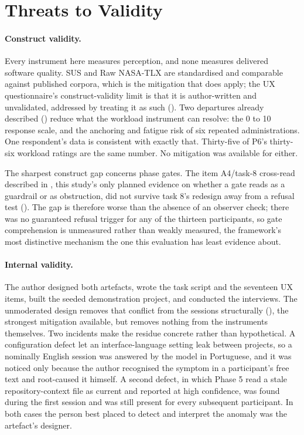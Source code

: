 \section{Threats to Validity}
\label{sec:threats}

\paragraph{Construct validity.} Every instrument here measures perception, and none measures delivered software quality. \ac{SUS} and Raw \ac{NASA-TLX} are standardised and comparable against published corpora, which is the mitigation that does apply; the \ac{UX} questionnaire's construct-validity limit is that it is author-written and unvalidated, addressed by treating it as such (). Two departures already described () reduce what the workload instrument can resolve: the 0 to 10 response scale, and the anchoring and fatigue risk of six repeated administrations. One respondent's data is consistent with exactly that. Thirty-five of P6's thirty-six workload ratings are the same number. No mitigation was available for either.

The sharpest construct gap concerns phase gates. The item A4/task-8 cross-read described in , this study's only planned evidence on whether a gate reads as a guardrail or as obstruction, did not survive task 8's redesign away from a refusal test (). The gap is therefore worse than the absence of an observer check; there was no guaranteed refusal trigger for any of the thirteen participants, so gate comprehension is unmeasured rather than weakly measured, the framework's most distinctive mechanism the one this evaluation has least evidence about.

\paragraph{Internal validity.} The author designed both artefacts, wrote the task script and the seventeen \ac{UX} items, built the seeded demonstration project, and conducted the interviews. The unmoderated design removes that conflict from the sessions structurally (), the strongest mitigation available, but removes nothing from the instruments themselves. Two incidents make the residue concrete rather than hypothetical. A configuration defect let an interface-language setting leak between projects, so a nominally English session was answered by the model in Portuguese, and it was noticed only because the author recognised the symptom in a participant's free text and root-caused it himself. A second defect, in which Phase 5 read a stale repository-context file as current and reported at high confidence, was found during the first session and was still present for every subsequent participant. In both cases the person best placed to detect and interpret the anomaly was the artefact's designer.

